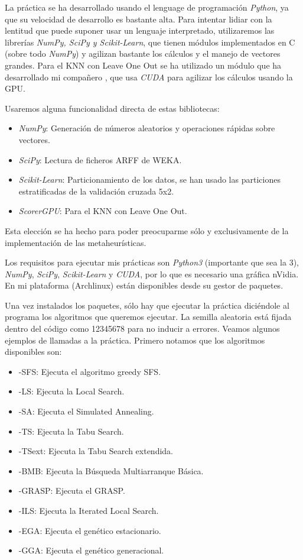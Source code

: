 \documentclass[a4paper, 11pt]{article}
\begin{document}
    La práctica se ha desarrollado usando el lenguage de programación \emph{Python}, ya que su velocidad de desarrollo es bastante alta. Para intentar lidiar con la lentitud que puede suponer usar un lenguaje interpretado, utilizaremos las librerías \emph{NumPy, SciPy y Scikit-Learn}, que tienen módulos implementados en C (sobre todo \emph{NumPy}) y agilizan bastante los cálculos y el manejo de vectores grandes. Para el KNN con Leave One Out se ha utilizado un módulo que ha desarrollado mi compañero , que usa \emph{CUDA} para agilizar los cálculos usando la GPU.

    Usaremos alguna funcionalidad directa de estas bibliotecas:
    \begin{itemize}
      \item \emph{NumPy}: Generación de números aleatorios y operaciones rápidas sobre vectores.
      \item \emph{SciPy}: Lectura de ficheros ARFF de WEKA.
      \item \emph{Scikit-Learn}: Particionamiento de los datos, se han usado las particiones estratificadas de la validación cruzada 5x2.
      \item \emph{ScorerGPU}: Para el KNN con Leave One Out.
    \end{itemize}

    Esta elección se ha hecho para poder preocuparme sólo y exclusivamente de la implementación de las metaheurísticas.

    Los requisitos para ejecutar mis prácticas son \emph{Python3} (importante que sea la 3), \emph{NumPy}, \emph{SciPy}, \emph{Scikit-Learn} y \emph{CUDA}, por lo que es necesario una gráfica nVidia. En mi plataforma (Archlinux) están disponibles desde su gestor de paquetes.

    Una vez instalados los paquetes, sólo hay que ejecutar la práctica diciéndole al programa los algoritmos que queremos ejecutar. La semilla aleatoria está fijada dentro del código como 12345678 para no inducir a errores. Veamos algunos ejemplos de llamadas a la práctica. Primero notamos que los algoritmos disponibles son:

    \begin{itemize}
      \item -SFS: Ejecuta el algoritmo greedy SFS.
      \item -LS: Ejecuta la Local Search.
      \item -SA: Ejecuta el Simulated Annealing.
      \item -TS: Ejecuta la Tabu Search.
      \item -TSext: Ejecuta la Tabu Search extendida.
      \item -BMB: Ejecuta la Búsqueda Multiarranque Básica.
      \item -GRASP: Ejecuta el GRASP.
      \item -ILS: Ejecuta la Iterated Local Search.
      \item -EGA: Ejecuta el genético estacionario.
      \item -GGA: Ejecuta el genético generacional.
    \end{itemize}
\end{document}

